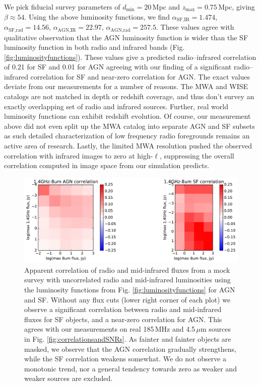 \documentclass{emulateapj}
\newcommand{\mintext}{\text{min}}
\newcommand{\maxtext}{\text{max}}
\begin{document}
We pick fiducial survey parameters of $d_\mintext=20$\,Mpc and $z_\maxtext=0.75$\,Mpc, giving $\beta\approx54$.  Using the above luminosity functions, we find $\alpha_{\text{SF,IR}}=1.474$, $\alpha_{\text{SF,rad}}=14.56$, $\alpha_{\text{AGN,IR}}=22.97$, $\alpha_{\text{AGN,rad}}=257.5$. These values agree with qualitative observation that the AGN luminosity function is wider than the SF luminosity function in both radio and infrared bands (Fig. \ref{fig:luminosityfunctions}). These values give a predicted radio--infrared correlation of 0.21 for SF and 0.01 for AGN agreeing with our finding of a significant radio--infrared correlation for SF and near-zero correlation for AGN. The exact values deviate from our measurements for a number of reasons. The MWA and WISE catalogs are not matched in depth or redshift coverage, and thus don't survey an exactly overlapping set of radio and infrared sources. Further, real world luminosity functions can exhibit redshift evolution. Of course, our measurement above did not even split up the MWA catalog into separate AGN and SF subsets as such detailed characterization of low frequency radio foregrounds remains an active area of research. Lastly, the limited MWA resolution pushed the observed correlation with infrared images to zero at high-$\ell$, suppressing the overall correlation computed in image space from our simulation predicts.

\begin{figure}[h]
\centering
\includegraphics[width=6in]{images/sim_correlation_agn_and_sf.pdf}
\caption{Apparent correlation of radio and mid-infrared fluxes from a mock survey with uncorrelated radio and mid-infrared luminosities using the luminosity functions from Fig. \ref{fig:luminosityfunctions} for AGN and SF. Without any flux cuts (lower right corner of each plot) we observe a significant correlation between radio and mid-infrared fluxes for SF objects, and a near-zero correlation for AGN. This agrees with our measurements on real 185\,MHz and 4.5\,$\mu$m sources in Fig. \ref{fig:correlationsandSNRs}. As fainter and fainter objects are masked, we observe that the AGN correlation gradually strengthens, while the SF correlation weakens somewhat. We do not observe a monotonic trend, nor a general tendency towards zero as weaker and weaker sources are excluded. }
\label{fig:simagnlfcorrelations}
\end{figure}
\end{document}
